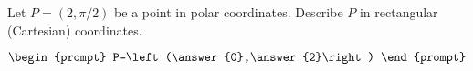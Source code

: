 \documentclass{ximera}
\author{Gregory Hartman \and Matthew Carr}
\begin{document}
\begin{exercise}





Let $P=(2,\pi/2)$ be a point in polar coordinates. Describe $P$ in rectangular (Cartesian) coordinates.

\[
\begin{prompt}
P=\left(\answer{0},\answer{2}\right)
\end{prompt}
\]

\end{exercise}
\end{document}
